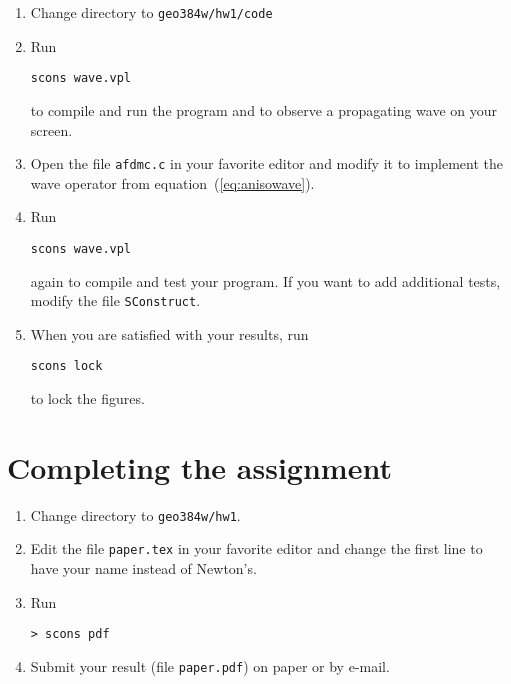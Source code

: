 
\begin{enumerate}
\item Change directory to \verb#geo384w/hw1/code#
\item Run
\begin{verbatim}
scons wave.vpl
\end{verbatim}
to compile and run the program and to observe a propagating wave on your screen.
\item Open the file \texttt{afdmc.c} in your favorite editor and modify it to implement the wave operator from equation~(\ref{eq:anisowave}).
\item Run
\begin{verbatim}
scons wave.vpl
\end{verbatim}
again to compile and test your program. If you want to add additional tests, modify the file \texttt{SConstruct}.
\item When you are satisfied with your results, run
\begin{verbatim}
scons lock
\end{verbatim}
to lock the figures.
\end{enumerate}

\lstset{language=python,numbers=left,numberstyle=\tiny,showstringspaces=false}


\section{Completing the assignment}

\begin{enumerate}
\item Change directory to \verb#geo384w/hw1#.
\item Edit the file \texttt{paper.tex} in your favorite editor and change the
first line to have your name instead of Newton's.
\item Run
\begin{verbatim}
> scons pdf
\end{verbatim}
\item Submit your result (file \texttt{paper.pdf}) on paper or by
e-mail.
\end{enumerate}
